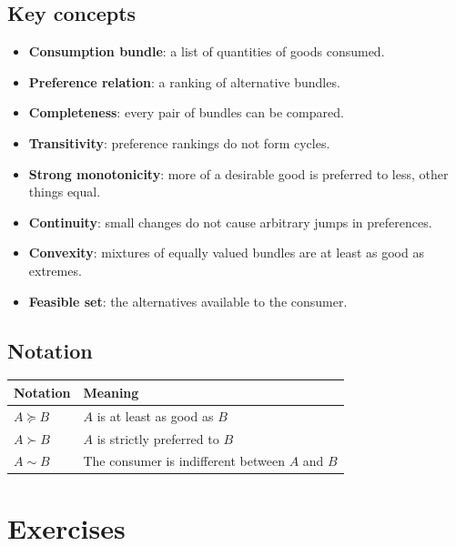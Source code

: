 \subsection*{Key concepts}
\begin{itemize}
  \item \textbf{Consumption bundle}: a list of quantities of goods consumed.
  \item \textbf{Preference relation}: a ranking of alternative bundles.
  \item \textbf{Completeness}: every pair of bundles can be compared.
  \item \textbf{Transitivity}: preference rankings do not form cycles.
  \item \textbf{Strong monotonicity}: more of a desirable good is preferred to less, other things equal.
  \item \textbf{Continuity}: small changes do not cause arbitrary jumps in preferences.
  \item \textbf{Convexity}: mixtures of equally valued bundles are at least as good as extremes.
  \item \textbf{Feasible set}: the alternatives available to the consumer.
\end{itemize}

\subsection*{Notation}
\begin{center}
\begin{tabular}{ll}
\toprule
Notation & Meaning \\
\midrule
$A\succeq B$ & $A$ is at least as good as $B$ \\
$A\succ B$ & $A$ is strictly preferred to $B$ \\
$A\sim B$ & The consumer is indifferent between $A$ and $B$ \\
\bottomrule
\end{tabular}
\end{center}

\section*{Exercises}

